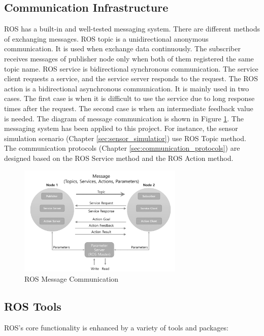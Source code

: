 \subsection{Communication Infrastructure}
ROS has a built-in and well-tested messaging system. There are different methods of exchanging messages. ROS topic is a unidirectional anonymous communication. It is used when exchange data continuously. The subscriber receives messages of publisher node only when both of them registered the same topic name. ROS service is bidirectional synchronous communication. The service client requests a service, and the service server responds to the request. The ROS action is a bidirectional asynchronous communication. It is mainly used in two cases. The first case is when it is difficult to use the service due to long response times after the request. The second case is when an intermediate feedback value is needed.
The diagram of message communication is shown in Figure \ref{fig:ros_message_communication}. The messaging system has been applied to this project. For instance, the sensor simulation scenario (Chapter \ref{sec:sensor_simulatior}) use ROS Topic method. The communication protocols (Chapter \ref{sec:communication_protocols}) are designed based on the ROS Service method and the ROS Action method. 

\begin{figure}
 \centering
 \includegraphics[width = 0.7\textwidth]{content/images/ch2/ros_message_communication.png}
 \caption{ROS Message Communication \cite{Pyo17}}
 \label{fig:ros_message_communication}
 \end{figure}
 
\subsection{ROS Tools}
ROS's core functionality is enhanced by a variety of tools and packages:

